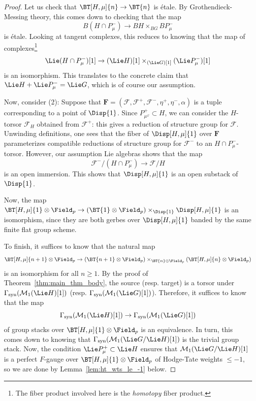 \documentclass[10pt]{amsart}
\begin{document}
\begin{proof}
Let us check that $\BT[H,\mu]{n}\to \BT{n}$ is \'etale. By Grothendieck-Messing theory, this comes down to checking that the map
\[
B(H\cap P_\mu^-)\to BH\times_{BG}BP_\mu^-
\]
is \'etale. Looking at tangent complexes, this reduces to knowing that the map of complexes\footnote{The fiber product involved here is the \emph{homotopy} fiber product.}
\[
\Lie(H\cap P_\mu^-)[1] \to (\Lie H)[1]\times_{(\Lie G)[1]}(\Lie P_\mu^-)[1]
\]
is an isomorphism. This translates to the concrete claim that $\Lie H+\Lie P^-_\mu = \Lie G$, which is of course our assumption.

Now, consider (2): Suppose that $\bm{F} = (\mathcal{F},\mathcal{F}^+,\mathcal{F}^-,\eta^+,\eta^-,\alpha)$ is a tuple corresponding to a point of $\Disp{1}$. Since $P^+_{\mu^\varphi}\subset H$, we can consider the $H$-torsor $\mathcal{F}_H$ obtained from $\mathcal{F}^+$: this gives a reduction of structure group for $\mathcal{F}$. Unwinding definitions, one sees that the fiber of $\Disp[H,\mu]{1}$ over $\bm{F}$ parameterizes compatible reductions of structure group for $\mathcal{F}^-$ to an $H\cap P_\mu^{-}$-torsor. However, our assumption Lie algebras shows that the map
\[
\mathcal{F}^-/(H\cap P_\mu^-) \to \mathcal{F}/H
\]
is an open immersion. This shows that $\Disp[H,\mu]{1}$ is an open substack of $\Disp{1}$.

Now, the map $\BT[H,\mu]{1}\otimes\Field_p\to (\BT{1}\otimes\Field_p)\times_{\Disp{1}}\Disp[H,\mu]{1}$ is an isomorphism, since they are both gerbes over $\Disp[H,\mu]{1}$ banded by the same finite flat group scheme.

To finish, it suffices to know that the natural map
\[
\BT[H,\mu]{n+1}\otimes\Field_p\to (\BT{n+1}\otimes\Field_p)\times_{\BT{n}\otimes\Field_p}(\BT[H,\mu]{n}\otimes\Field_p)
\]
is an isomorphism for all $n\ge 1$. By the proof of Theorem~\ref{thm:main_thm_body}, the source (resp. target) is a torsor under $\Gamma_{\mathrm{syn}}(\mathcal{M}_1(\Lie H)[1])$ (resp. $\Gamma_{\mathrm{syn}}(\mathcal{M}_1(\Lie G)[1])$). Therefore, it suffices to know that the map
\[
\Gamma_{\mathrm{syn}}(\mathcal{M}_1(\Lie H)[1])\to \Gamma_{\mathrm{syn}}(\mathcal{M}_1(\Lie G)[1])
\]
of group stacks over $\BT[H,\mu]{1}\otimes\Field_p$ is an equivalence. In turn, this comes down to knowing that $\Gamma_{\mathrm{syn}}(\mathcal{M}_1(\Lie G/\Lie H)[1])$ is the trivial group stack. Now, the condition $\Lie P_\mu^+\subset \Lie H$ ensures that $\mathcal{M}_1(\Lie G/\Lie H)[1]$ is a perfect $F$-gauge over $\BT[H,\mu]{1}\otimes\Field_p$ of Hodge-Tate weights $\leq -1$, so we are done by Lemma~\ref{lem:ht_wts_le_-1} below.
\end{proof}
\end{document}
